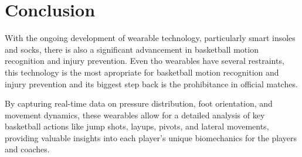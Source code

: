 


%

\chapter{Conclusion}
\label{cha:conclusion}


With the ongoing development of wearable technology, particularly smart insoles and socks, there is also a significant advancement in basketball motion recognition and 
injury prevention. Even tho wearables have several restraints, this technology is the most apropriate for basketball motion recognition and injury prevention and its biggest step 
back is the prohibitance in official matches.

By capturing real-time data on pressure distribution, foot orientation, and movement dynamics, these wearables allow for a 
detailed analysis of key basketball actions like jump shots, layups, pivots, and lateral movements, providing valuable insights into each player's unique biomechanics for the players 
and coaches. 
